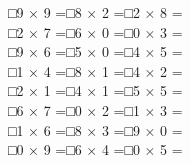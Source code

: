 \documentclass[uplatex,
paper=a4,
fontsize=18pt,
jafontsize=16pt,
number_of_lines=30,
line_length=30zh,
baselineskip=25pt,
]{jlreq}
\begin{document}
□\hspace{1em}9 × 9 =\hspace{3em}□\hspace{1em}8 × 2 =\hspace{3em}□\hspace{1em}2 × 8 =\hspace{3em}
\\

□\hspace{1em}2 × 7 =\hspace{3em}□\hspace{1em}6 × 0 =\hspace{3em}□\hspace{1em}0 × 3 =\hspace{3em}
\\

□\hspace{1em}9 × 6 =\hspace{3em}□\hspace{1em}5 × 0 =\hspace{3em}□\hspace{1em}4 × 5 =\hspace{3em}
\\

□\hspace{1em}1 × 4 =\hspace{3em}□\hspace{1em}8 × 1 =\hspace{3em}□\hspace{1em}4 × 2 =\hspace{3em}
\\

□\hspace{1em}2 × 1 =\hspace{3em}□\hspace{1em}4 × 1 =\hspace{3em}□\hspace{1em}5 × 5 =\hspace{3em}
\\

□\hspace{1em}6 × 7 =\hspace{3em}□\hspace{1em}0 × 2 =\hspace{3em}□\hspace{1em}1 × 3 =\hspace{3em}
\\

□\hspace{1em}1 × 6 =\hspace{3em}□\hspace{1em}8 × 3 =\hspace{3em}□\hspace{1em}9 × 0 =\hspace{3em}
\\

□\hspace{1em}0 × 9 =\hspace{3em}□\hspace{1em}6 × 4 =\hspace{3em}□\hspace{1em}0 × 5 =\hspace{3em}
\\
\end{document}
